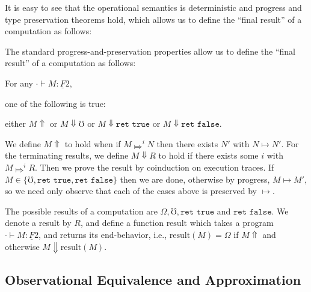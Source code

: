 \documentclass[acmsmall,nonacm]{acmart}
\renewcommand{\u}{\underline}
\newcommand{\step}{\mapsto}
\newcommand{\bigstepsin}[1]{\mathrel{\Mapsto^{#1}}}
\newcommand{\tru}{\texttt{true}}
\newcommand{\fls}{\texttt{false}}
\newcommand{\err}{\mho}
\newcommand{\diverge}{\Omega}
\newcommand{\result}{\text{result}}
\newcommand{\kw}[1]{\texttt{#1}\,\,}
\newcommand{\ret}{\kw{ret}}
\begin{document}
{\begin{shortonly}
  It is easy to see that the operational semantics is deterministic
  and progress and type preservation theorems hold, which allows us to
  define the ``final result'' of a computation as follows:
\end{shortonly}
\begin{longonly}
The standard progress-and-preservation properties allow us to define
 the ``final result'' of a computation as follows:
\end{longonly}
\begin{corollary}
  For any $\cdot \vdash M : \u F 2$,
  \begin{longonly}
    one of the following is true:
  \end{longonly}
  \begin{shortonly}
    either $M \Uparrow$ or $M \Downarrow \err$ or $M \Downarrow \ret
    \tru$ or  $M \Downarrow \ret \fls$.
  \end{shortonly}
\end{corollary}
\begin{longproof}
  We define $M \Uparrow$ to hold when if $M \bigstepsin{i} N$ then
  there exists $N'$ with $N \step N'$. For the terminating results, we
  define $M \Downarrow R$ to hold if there exists some $i$ with $M
  \bigstepsin{i} R$. Then we prove the result by coinduction on
  execution traces. If $M \in \{ \err, \ret\tru, \ret\fls \}$ then we
  are done, otherwise by progress, $M \step M'$, so we need only
  observe that each of the cases above is preserved by $\step$.
\end{longproof}
\begin{definition}[Results]
   The possible results of a computation are $ \diverge, \err,
   \ret \tru$ and $\ret \fls$. We denote a result by $R$, and define a
   function $\result$ which takes a program $\cdot \vdash M : \u F 2$,
   and returns its end-behavior, i.e., $\result(M)= \diverge$ if $M
   \Uparrow$ and otherwise $M \Downarrow \result(M)$.
\end{definition}

\subsection{Observational Equivalence and Approximation}
\label{sec:obs-equiv-approx}

}
\end{document}
